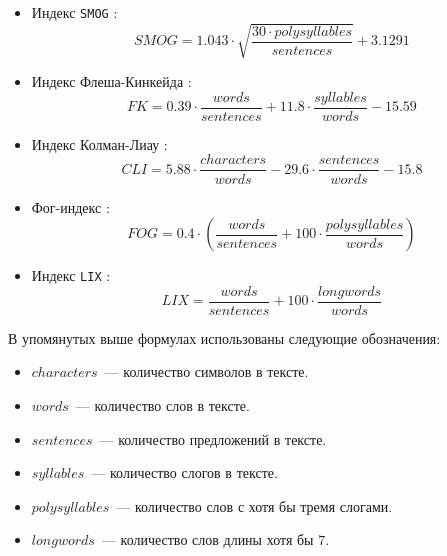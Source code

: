 \documentclass[../diploma.tex]{subfiles}
\begin{document}
\begin{itemize}
   		\item
   		Индекс \texttt{SMOG} \cite{article:smog}: 
   		\begin{equation}
   			SMOG = 1.043 \cdot \sqrt{\frac{30 \cdot polysyllables}{sentences}} + 3.1291
   		\end{equation}

   		\item
   		Индекс Флеша-Кинкейда \cite{article:fk}: 
   		\begin{equation}
   			FK = 0.39 \cdot \frac{words}{sentences} + 11.8 \cdot \frac{syllables}{words} - 15.59
   		\end{equation}
   	
   		\item
   		Индекс Колман-Лиау \cite{article:cli}: 
   		\begin{equation}
   			CLI = 5.88 \cdot \frac{characters}{words} - 29.6 \cdot \frac{sentences}{words} - 15.8
   		\end{equation}
   		
   		\item
   		Фог-индекс \cite{book:fog}: 
   		\begin{equation}
   			FOG = 0.4 \cdot \left( \frac{words}{sentences} + 100 \cdot \frac{polysyllables}{words} \right)
   		\end{equation}

   		\item
   		Индекс \texttt{LIX} \cite{book:lix}: 
   		\begin{equation}
   			LIX = \frac{words}{sentences} + 100 \cdot \frac{longwords}{words}
   		\end{equation}
   	
   	\end{itemize}
    
    В упомянутых выше формулах использованы следующие обозначения:
    
    \begin{itemize}
    	\item
    	$characters$~--- количество символов в тексте.

	    \item
	   	$words$~--- количество слов в тексте.

	    \item
	   	$sentences$~--- количество предложений в тексте.

	    \item
	   	$syllables$~--- количество слогов в тексте.

	    \item
	   	$polysyllables$~--- количество слов с хотя бы тремя слогами.

	    \item
	   	$longwords$~--- количество слов длины хотя бы $7$.
	\end{itemize}
\end{document}
